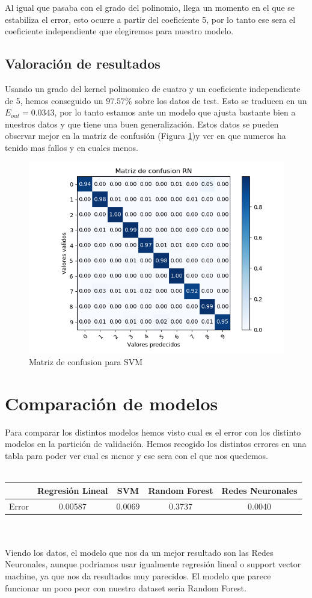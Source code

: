 \documentclass[12pt,a4paper]{article}
\begin{document}
Al igual que pasaba con el grado del polinomio, llega un momento en el que se estabiliza el error, esto ocurre a partir del coeficiente 5, por lo tanto ese sera el coeficiente independiente que elegiremos para nuestro modelo.
\subsection{Valoración de resultados}
Usando un grado del kernel polinomico de cuatro y un coeficiente independiente de 5, hemos conseguido un  $97.57\%$ sobre los datos de test. Esto se traducen en un $E_{out}=0.0343$, por lo tanto estamos ante un modelo que ajusta bastante bien a nuestros datos y que tiene una buen generalización. Estos datos se pueden observar mejor en la matriz de confusión (Figura \ref{fig:matrizConfusionSVM})y ver en que numeros ha tenido mas fallos y en cuales menos. 
 \begin{figure}[H]
	\centering
	\includegraphics[width=0.7\linewidth]{images/confusionmatrixsvm.png}
	\caption[Matriz de confusion para SVM]{Matriz de confusion para SVM}
	\label{fig:matrizConfusionSVM}
\end{figure}
\section{Comparación de modelos}
Para comparar los distintos modelos hemos visto cual es el error con los distinto modelos en la partición de validación. Hemos recogido los distintos errores en una tabla para poder ver cual es menor y ese sera con el que nos quedemos.\\\\
\begin{tabular}{|c|c|c|c|c|}
	\hline 
	& Regresión Lineal & SVM & Random Forest & Redes Neuronales \\ 
	\hline 
	Error & 0.00587 & 0.0069 & 0.3737 & 0.0040 \\ 
	\hline 
\end{tabular}\\\\
Viendo los datos, el modelo que nos da un mejor resultado son las Redes Neuronales, aunque podriamos usar igualmente regresión lineal o support vector machine, ya que nos da resultados muy parecidos. El modelo que parece funcionar un poco peor con nuestro dataset seria Random Forest. 
\end{document}
